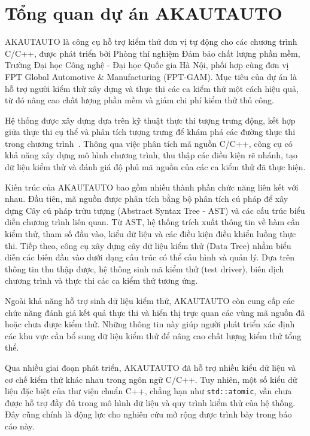 \section{Tổng quan dự án AKAUTAUTO}

AKAUTAUTO là công cụ hỗ trợ kiểm thử đơn vị tự động cho các chương trình C/C++, được phát triển bởi Phòng thí nghiệm Đảm bảo chất lượng phần mềm, Trường Đại học Công nghệ - Đại học Quốc gia Hà Nội, phối hợp cùng đơn vị FPT Global Automotive \& Manufacturing (FPT-GAM). Mục tiêu của dự án là hỗ trợ người kiểm thử xây dựng và thực thi các ca kiểm thử một cách hiệu quả, từ đó nâng cao chất lượng phần mềm và giảm chi phí kiểm thử thủ công.

Hệ thống được xây dựng dựa trên kỹ thuật thực thi tượng trưng động, kết hợp giữa thực thi cụ thể và phân tích tượng trưng để khám phá các đường thực thi trong chương trình~\cite{nguyenducanh2015,sen2005cute}. Thông qua việc phân tích mã nguồn C/C++, công cụ có khả năng xây dựng mô hình chương trình, thu thập các điều kiện rẽ nhánh, tạo dữ liệu kiểm thử và đánh giá độ phủ mã nguồn của các ca kiểm thử đã thực hiện.

Kiến trúc của AKAUTAUTO bao gồm nhiều thành phần chức năng liên kết với nhau. Đầu tiên, mã nguồn được phân tích bằng bộ phân tích cú pháp để xây dựng Cây cú pháp trừu tượng (Abstract Syntax Tree - AST) và các cấu trúc biểu diễn chương trình liên quan. Từ AST, hệ thống trích xuất thông tin về hàm cần kiểm thử, tham số đầu vào, kiểu dữ liệu và các điều kiện điều khiển luồng thực thi. Tiếp theo, công cụ xây dựng cây dữ liệu kiểm thử (Data Tree) nhằm biểu diễn các biến đầu vào dưới dạng cấu trúc có thể cấu hình và quản lý. Dựa trên thông tin thu thập được, hệ thống sinh mã kiểm thử (test driver), biên dịch chương trình và thực thi các ca kiểm thử tương ứng.

Ngoài khả năng hỗ trợ sinh dữ liệu kiểm thử, AKAUTAUTO còn cung cấp các chức năng đánh giá kết quả thực thi và hiển thị trực quan các vùng mã nguồn đã hoặc chưa được kiểm thử. Những thông tin này giúp người phát triển xác định các khu vực cần bổ sung dữ liệu kiểm thử để nâng cao chất lượng kiểm thử tổng thể.

Qua nhiều giai đoạn phát triển, AKAUTAUTO đã hỗ trợ nhiều kiểu dữ liệu và cơ chế kiểm thử khác nhau trong ngôn ngữ C/C++. Tuy nhiên, một số kiểu dữ liệu đặc biệt của thư viện chuẩn C++, chẳng hạn như \texttt{std::atomic}, vẫn chưa được hỗ trợ đầy đủ trong mô hình dữ liệu và quy trình kiểm thử của hệ thống. Đây cũng chính là động lực cho nghiên cứu mở rộng được trình bày trong báo cáo này.


